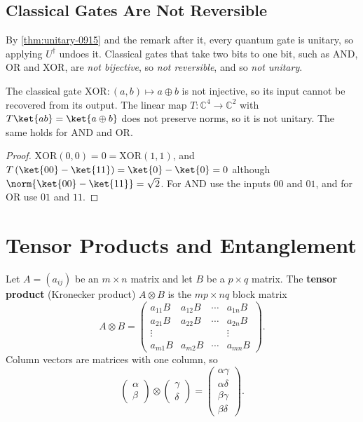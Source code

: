\subsection{Classical Gates Are Not Reversible}

By \cref{thm:unitary-0915} and the remark after it, every quantum gate is unitary, so applying
$U^\dagger$ undoes it. Classical gates that take two bits to one bit, such as AND, OR and XOR, are
\emph{not bijective}, so \emph{not reversible}, and so \emph{not unitary}.

\begin{lemma}\label{lem:xor-0915}
    The classical gate $\mathrm{XOR} \colon (a, b) \mapsto a \oplus b$ is not injective, so its
    input cannot be recovered from its output. The linear map
    $T \colon \mathbb{C}^4 \to \mathbb{C}^2$ with $T \ket{a b} = \ket{a \oplus b}$ does not preserve
    norms, so it is not unitary. The same holds for AND and OR.
\end{lemma}

\begin{proof}
    $\mathrm{XOR}(0,0) = 0 = \mathrm{XOR}(1,1)$, and
    $T\left(\ket{00} - \ket{11}\right) = \ket{0} - \ket{0} = 0$ although
    $\norm{\ket{00} - \ket{11}} = \sqrt{2}$. For AND use the inputs $00$ and $01$, and for OR use
    $01$ and $11$.
\end{proof}

\section{Tensor Products and Entanglement}

\begin{definition}\label{def:tensor-0915}
    Let $A = (a_{ij})$ be an $m \times n$ matrix and let $B$ be a $p \times q$ matrix. The
    \textbf{tensor product} (Kronecker product) $A \otimes B$ is the $mp \times nq$ block matrix
    \[A \otimes B = \begin{pmatrix}
            a_{11} B & a_{12} B & \cdots & a_{1n} B \\
            a_{21} B & a_{22} B & \cdots & a_{2n} B \\
            \vdots   &          &        & \vdots   \\
            a_{m1} B & a_{m2} B & \cdots & a_{mn} B
        \end{pmatrix}.\]
    Column vectors are matrices with one column, so
    \[\begin{pmatrix} \alpha \\ \beta \end{pmatrix} \otimes \begin{pmatrix} \gamma \\ \delta \end{pmatrix}
        = \begin{pmatrix} \alpha\gamma \\ \alpha\delta \\ \beta\gamma \\ \beta\delta \end{pmatrix}.\]
\end{definition}

